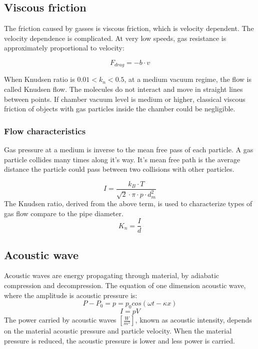 \documentclass[\main/master.tex]{subfiles}
\begin{document}
\subsection{Viscous friction}
The friction caused by gasses is viscous friction, which is velocity dependent. The velocity dependence is complicated. At very low speeds, gas resistance is approximately proportional to velocity: 

\begin{equation}
F_{drag} = -b\cdot v  \label{eqn:energy-mass-equivalence-relation}
\end{equation}
\par\noindent
When Knudsen ratio is $0.01<k_n<0.5$, at a medium vacuum regime, the flow is called Knudsen flow. The molecules do not interact and move in straight lines between points. If chamber vacuum level is medium or higher, classical viscous friction of objects with gas particles inside the chamber could be negligible.

\subsubsection{Flow characteristics}
Gas pressure at a medium is inverse to the mean free pass of each particle. A gas particle collides many times along it's way. It's mean free path is the average distance the particle could pass between two collisions with other particles. 


\begin{equation}
I = \frac{k_B\cdot T}{\sqrt{2}\cdot\pi\cdot p\cdot d_m^2}     \label{eqn:mean-free-pass}
\end{equation}
The Knudsen ratio, derived from the above term, is used to characterize types of gas flow compare to the pipe diameter.
\begin{equation}
K_n = \frac{I}{d}     \label{eqn:mean-free-pass}
\end{equation}

\subsection{Acoustic wave}
Acoustic waves are energy propagating through material, by adiabatic compression and decompression. The equation of one dimension acoustic wave, where the amplitude is acoustic pressure is:
\begin{equation}
P-P_0 = p = p_0cos(\omega t -\kappa x)       \label{eqn:acoustic_pressure}
\end{equation}
\begin{equation}
I = pV      \label{eqn:acoustic_intensity}
\end{equation} 
The power carried by acoustic waves $[\frac{W}{m^2}]$, known as acoustic intensity, depends on the material acoustic pressure and particle velocity. When the material pressure is reduced, the acoustic pressure is lower and less power is carried.
\end{document}
